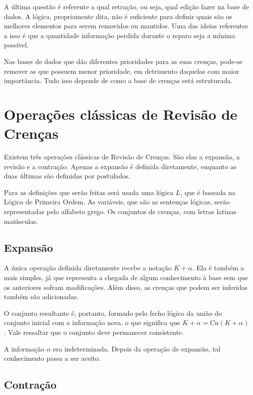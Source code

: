 A última questão é referente a qual retração, ou seja, qual edição fazer na base de dados. A lógica, propriamente dita, não é suficiente para definir quais são os melhores elementos para serem removidos ou mantidos. Uma das ideias referentes a isso é que a quantidade informação perdida durante o reparo seja a mínima possível. 

Nas bases de dados que dão diferentes prioridades para as suas crenças, pode-se remover as que possuem menor prioridade, em detrimento daquelas com maior importância. Tudo isso depende de como a base de crenças está estruturada.

\section{Operações clássicas de Revisão de Crenças}

Existem três operações clássicas de Revisão de Crenças. São elas a expansão, a revisão e a contração. Apenas a expansão é definida diretamente, enquanto as duas últimas são definidas por postulados. 

Para as definições que serão feitas será usada uma lógica $ L $, que é baseada na Lógica de Primeira Ordem. As variáveis, que são as sentenças lógicas, serão representadas pelo alfabeto grego. Os conjuntos de crenças, com letras latinas maiúsculas.

\subsection{Expansão}

A única operação definida diretamente recebe a notação $ K + \alpha $. Ela é também a mais simples, já que representa a chegada de algum conhecimento à base sem que os anteriores sofram modificações. Além disso, as crenças que podem ser inferidas também são adicionadas.

O conjunto resultante é, portanto, formado pelo fecho lógico da união do conjunto inicial com a informação nova, o que significa que $ K + \alpha = \text{Cn}(K + \alpha) $. Vale ressaltar que o conjunto deve permanecer consistente.

A informação $ \alpha $ era indeterminada. Depois da operação de expansão, tal conhecimento passa a ser aceito.

\subsection{Contração}


